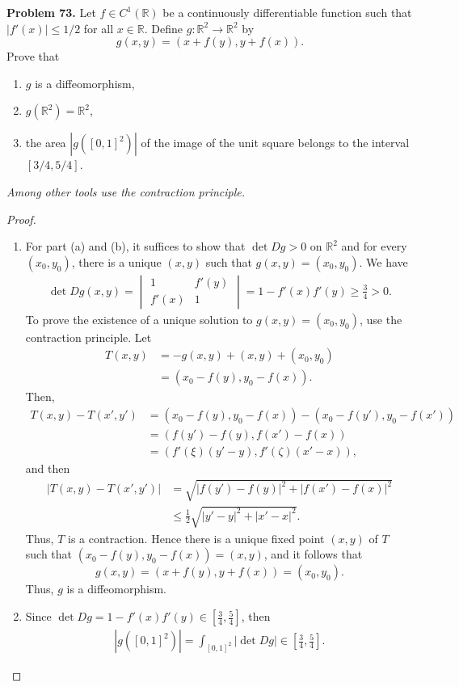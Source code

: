 \documentclass[11pt]{article}
\theoremstyle{definition}
\theoremstyle{definition}
\begin{document}
\noindent
{\bf Problem 73.}
Let $f\in C^1(\mathbb{R})$ be a continuously differentiable function such that $|f'(x)|\leq 1/2$ for all $x\in\mathbb{R}$. Define
$g:\mathbb{R}^2\to\mathbb{R}^2$ by
$$
g(x,y)=(x+f(y),y+f(x)).
$$
Prove that
\begin{enumerate}[label=(\alph*)]
	\item $g$ is a diffeomorphism,
	
	\item $g(\mathbb{R}^2)=\mathbb{R}^2$,
	
	\item the area $|g([0,1]^2)|$ of the image of the unit square belongs to the interval $[3/4,5/4]$.
\end{enumerate}
 {\em Among other tools use the contraction principle.}
\begin{proof}
~\begin{enumerate}[label=(\alph*)]
    \item For part (a) and (b), it suffices to show that $\det Dg > 0$ on $\mathbb{R}^2$ and for every $(x_0, y_0)$, there is a unique $(x,y)$ such that $g(x,y) = (x_0, y_0)$. We have
    \begin{align*}
        \det Dg(x,y) = \begin{vmatrix}
            1 & f'(y) \\
            f'(x) & 1
        \end{vmatrix} = 1 - f'(x)f'(y) \geq \frac{3}{4} > 0.
    \end{align*}
    To prove the existence of a unique solution to $g(x,y) = (x_0, y_0)$, use the contraction principle. Let
    \begin{align*}
        T(x,y) & = - g(x,y) + (x,y) + (x_0, y_0) \\
        & = (x_0-f(y), y_0-f(x)).
    \end{align*}
    Then,
    \begin{align*}
        T(x,y) - T(x',y') & = (x_0-f(y), y_0-f(x)) - (x_0-f(y'), y_0-f(x')) \\
        & = (f(y') - f(y), f(x') - f(x)) \\
        & = \left(f'(\xi)(y'-y), f'(\zeta)(x'-x)\right),
    \end{align*}
    and then 
    \begin{align*}
        \left|T(x,y) - T(x',y')\right| & = \sqrt{|f(y') - f(y)|^2 + |f(x') - f(x)|^2} \\
        & \leq \frac{1}{2} \sqrt{|y' - y|^2 + |x' - x|^2}.
    \end{align*}
    Thus, $T$ is a contraction. Hence there is a unique fixed point $(x,y)$ of $T$ such that $(x_0-f(y), y_0-f(x)) = (x,y)$, and it follows that $$g(x,y) = (x+f(y), y+f(x)) = (x_0, y_0).$$ Thus, $g$ is a diffeomorphism.
    
    \setcounter{enumi}{2}
    \item Since $\det Dg = 1 - f'(x)f'(y) \in \left[\frac{3}{4}, \frac{5}{4}\right]$, then
    \begin{align*}
        \left|g([0,1]^2)\right| = \int_{[0,1]^2} |\det Dg| \in \left[\frac{3}{4}, \frac{5}{4}\right].
    \end{align*}
\end{enumerate}
\end{proof}
\end{document}

